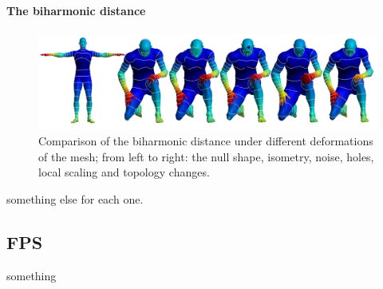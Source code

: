 \paragraph{The biharmonic distance}
\begin{figure}[h]
	\centering
	\includegraphics[width = \textwidth]{../results/biharmonic_isolines}
	\caption{Comparison of the biharmonic distance under different deformations of the mesh; from left to right: the null shape, isometry, noise, holes, local scaling and topology changes.}
	\label{fig:biharmonic_isolines}
\end{figure}
something else for each one.

\subsection{FPS}
something

